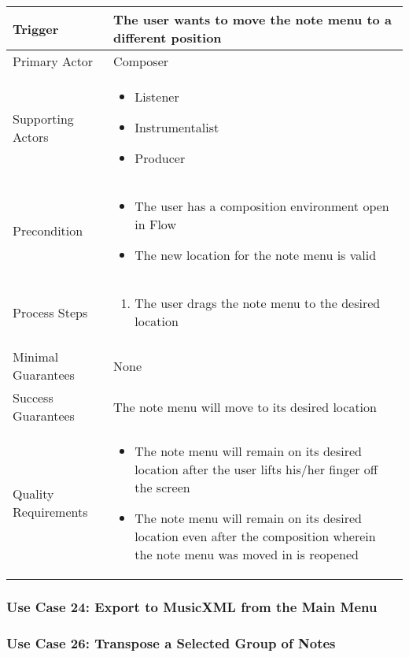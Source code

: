 \begin{tabularx}{\textwidth}{|X|X|}
\hline
Trigger & 
The user wants to move the note menu to a different position\\
\hline
Primary Actor & 
Composer \\
\hline
Supporting Actors & 
\begin{itemize}
\item Listener
\item Instrumentalist
\item Producer
\end{itemize} \\
\hline
Precondition & 
\begin{itemize}
\item The user has a composition environment open in Flow
\item The new location for the note menu is valid
\end{itemize} \\
\hline
Process Steps & 
\begin{enumerate}
\item The user drags the note menu to the desired location
\end{enumerate} \\
\hline
Minimal Guarantees & 
None \\
\hline
Success Guarantees & 
The note menu will move to its desired location\\
\hline
Quality Requirements & 
\begin{itemize}
\item The note menu will remain on its desired location after the user lifts his/her finger off the screen
\item The note menu will remain on its desired location even after the composition wherein the note menu was moved in is reopened
\end{itemize} \\ 
\hline
\end{tabularx}

\subsubsection{Use Case 24: Export to MusicXML from the Main Menu}



\subsubsection{Use Case 26: Transpose a Selected Group of Notes}

